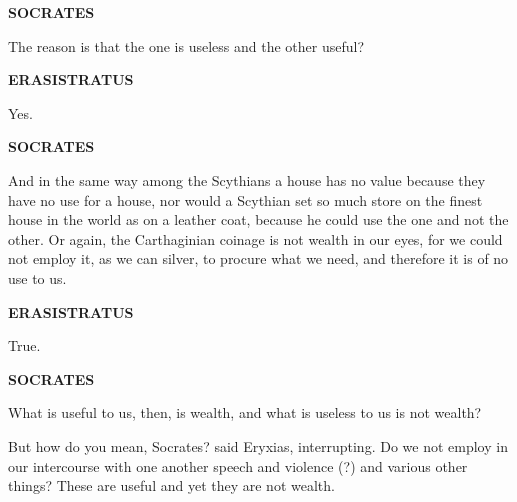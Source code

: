 \documentclass[11pt,letter]{article}
\begin{document}
\par \textbf{SOCRATES}
\par   The reason is that the one is useless and the other useful?

\par \textbf{ERASISTRATUS}
\par   Yes.

\par \textbf{SOCRATES}
\par   And in the same way among the Scythians a house has no value because they have no use for a house, nor would a Scythian set so much store on the finest house in the world as on a leather coat, because he could use the one and not the other. Or again, the Carthaginian coinage is not wealth in our eyes, for we could not employ it, as we can silver, to procure what we need, and therefore it is of no use to us.

\par \textbf{ERASISTRATUS}
\par   True.

\par \textbf{SOCRATES}
\par   What is useful to us, then, is wealth, and what is useless to us is not wealth?

\par  But how do you mean, Socrates? said Eryxias, interrupting. Do we not employ in our intercourse with one another speech and violence (?) and various other things? These are useful and yet they are not wealth.
\end{document}
